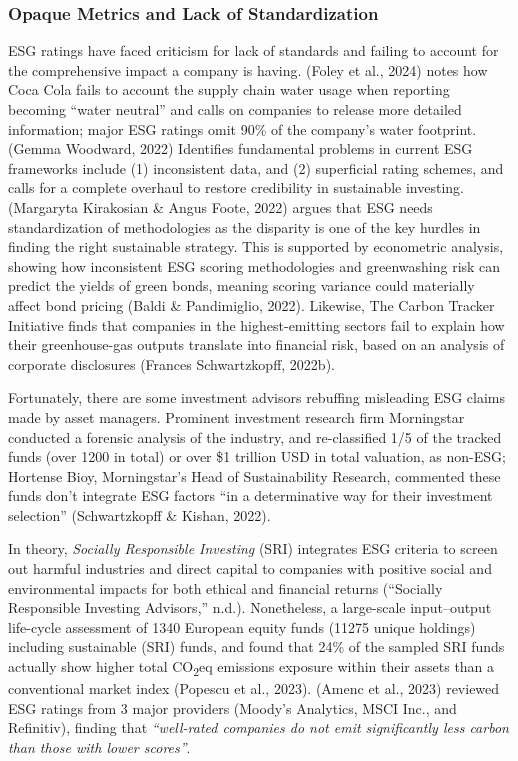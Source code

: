 \documentclass[
  12pt,
  letterpaper,
  DIV=11,
  numbers=noendperiod]{scrartcl}
\begin{document}
\subsubsection{Opaque Metrics and Lack of
Standardization}\label{opaque-metrics-and-lack-of-standardization}

ESG ratings have faced criticism for lack of standards and failing to
account for the comprehensive impact a company is having. (Foley et al.,
2024) notes how Coca Cola fails to account the supply chain water usage
when reporting becoming ``water neutral'' and calls on companies to
release more detailed information; major ESG ratings omit 90\% of the
company's water footprint. (Gemma Woodward, 2022) Identifies fundamental
problems in current ESG frameworks include (1) inconsistent data, and
(2) superficial rating schemes, and calls for a complete overhaul to
restore credibility in sustainable investing. (Margaryta Kirakosian \&
Angus Foote, 2022) argues that ESG needs standardization of
methodologies as the disparity is one of the key hurdles in finding the
right sustainable strategy. This is supported by econometric analysis,
showing how inconsistent ESG scoring methodologies and greenwashing risk
can predict the yields of green bonds, meaning scoring variance could
materially affect bond pricing (Baldi \& Pandimiglio, 2022). Likewise,
The Carbon Tracker Initiative finds that companies in the
highest-emitting sectors fail to explain how their greenhouse-gas
outputs translate into financial risk, based on an analysis of corporate
disclosures (Frances Schwartzkopff, 2022b).

Fortunately, there are some investment advisors rebuffing misleading ESG
claims made by asset managers. Prominent investment research firm
Morningstar conducted a forensic analysis of the industry, and
re-classified 1/5 of the tracked funds (over 1200 in total) or over \$1
trillion USD in total valuation, as non-ESG; Hortense Bioy,
Morningstar's Head of Sustainability Research, commented these funds
don't integrate ESG factors ``in a determinative way for their
investment selection'' (Schwartzkopff \& Kishan, 2022).

In theory, \emph{Socially Responsible Investing} (SRI) integrates ESG
criteria to screen out harmful industries and direct capital to
companies with positive social and environmental impacts for both
ethical and financial returns ({``Socially {Responsible Investing
Advisors},''} n.d.). Nonetheless, a large-scale input--output life-cycle
assessment of 1340 European equity funds (11275 unique holdings)
including sustainable (SRI) funds, and found that 24\% of the sampled
SRI funds actually show higher total CO\textsubscript{2}eq emissions
exposure within their assets than a conventional market index (Popescu
et al., 2023). (Amenc et al., 2023) reviewed ESG ratings from 3 major
providers (Moody's Analytics, MSCI Inc., and Refinitiv), finding that
\emph{``well-rated companies do not emit significantly less carbon than
those with lower scores''}.
\end{document}
